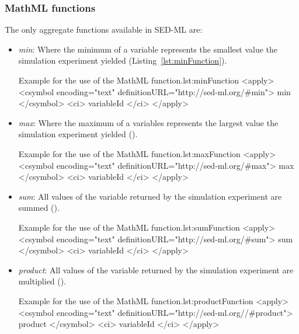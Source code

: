 \subsubsection{MathML functions}
The only aggregate functions available in SED-ML \currentLV are:

\begin{itemize}\setlength{\parskip}{-0.1ex}

\item \emph{min}: Where the minimum of a variable represents the smallest value 
the simulation experiment yielded (Listing~\ref{lst:minFunction}). 
%
\begin{myXmlLst}{Example for the use of the MathML  function.}{lst:minFunction}
<apply>
 	<csymbol encoding="text" definitionURL="http://sed-ml.org/#min">
 		min
 	</csymbol>
 	<ci> variableId </ci>
</apply>
\end{myXmlLst}

\item \emph{max}: Where the maximum of a variables represents the largest value 
the simulation experiment yielded ().
%
\begin{myXmlLst}{Example for the use of the MathML  function.}{lst:maxFunction}
<apply>
 	<csymbol encoding="text" definitionURL="http://sed-ml.org/#max">
 		max
 	</csymbol>
 	<ci> variableId </ci>
</apply>
\end{myXmlLst}

\item \emph{sum}: All values of the variable returned by the simulation 
experiment are summed ().
%
\begin{myXmlLst}{Example for the use of the MathML  function.}{lst:sumFunction}
<apply>
 	<csymbol encoding="text" definitionURL="http://sed-ml.org/#sum">
 		sum
 	</csymbol>
 	<ci> variableId </ci>
</apply>
\end{myXmlLst}


\item \emph{product}: All values of the variable returned by the simulation 
experiment are multiplied ().
%
\begin{myXmlLst}{Example for the use of the MathML  function.}{lst:productFunction}
<apply>
 	<csymbol encoding="text" definitionURL="http://sed-ml.org//#product">
 		product
 	</csymbol>
 	<ci> variableId </ci>
</apply>
\end{myXmlLst}

\end{itemize}

